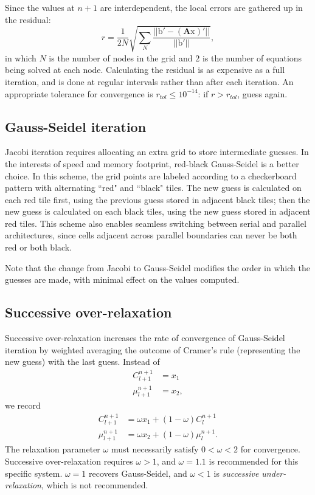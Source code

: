 	Since the values at $n+1$ are interdependent, the local errors are gathered up in the residual:
	\[r = \frac{1}{2N}\sqrt{\sum\limits_{N}\frac{||\mathrm{b}' - \left(\mathbf{A}\mathrm{x}\right)'||}{||\mathrm{b}'||}},\]
	in which $N$ is the number of nodes in the grid and $2$ is the number of equations being solved at each node.
	Calculating the residual is as expensive as a full iteration, and is done at regular intervals rather than after each iteration.
	An appropriate tolerance for convergence is $r_{tol}\leq10^{-14}$: if $r>r_{tol}$, guess again.

	\subsection{Gauss-Seidel iteration}
	Jacobi iteration requires allocating an extra grid to store intermediate guesses.
	In the interests of speed and memory footprint, red-black Gauss-Seidel is a better choice.
	In this scheme, the grid points are labeled according to a checkerboard pattern with alternating ``red" and ``black" tiles.
	The new guess is calculated on each red tile first, using the previous guess stored in adjacent black tiles;
	then the new guess is calculated on each black tiles, using the new guess stored in adjacent red tiles.
	This scheme also enables seamless switching between serial and parallel architectures, since cells adjacent
	across parallel boundaries can never be both red or both black.
	
	Note that the change from Jacobi to Gauss-Seidel modifies the order in which the guesses are made,
	with minimal effect on the values computed.
	
	\subsection{Successive over-relaxation}
	Successive over-relaxation increases the rate of convergence of Gauss-Seidel iteration by weighted averaging
	the outcome of Cramer's rule (representing the new guess) with the last guess.
	Instead of
	\begin{align*}
		C_{l+1}^{n+1} &= x_1\\
		\mu_{l+1}^{n+1} &= x_2,
	\end{align*}
	we record
	\begin{align*}
		C_{l+1}^{n+1} &= \omega x_1 + (1-\omega)C_l^{n+1} \\
		\mu_{l+1}^{n+1} &= \omega x_2 + (1-\omega)\mu_l^{n+1}.
	\end{align*}
	The relaxation parameter $\omega$ must necessarily satisfy $0<\omega<2$ for convergence.
	Successive over-relaxation requires $\omega>1$, and $\omega=1.1$ is recommended for this specific system.
	$\omega=1$ recovers Gauss-Seidel, and $\omega<1$ is \emph{successive under-relaxation}, which is not recommended.

